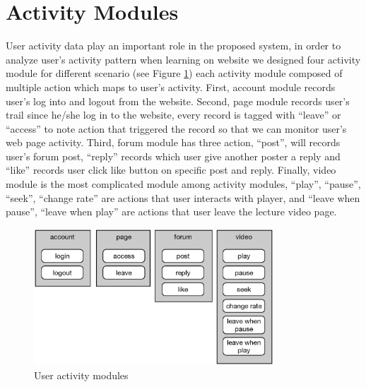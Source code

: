 \section{Activity Modules}
User activity data play an important role in the proposed system, in order to analyze user's activity pattern when learning on website we designed four activity module for different scenario (see Figure \ref{fig:act-module}) each activity module composed of multiple action which maps to user's activity.
First, account module records user's log into and logout from the website.
Second, page module records user's trail since he/she log in to the website, every record is tagged with ``leave'' or ``access'' to note action that triggered the record so that we can monitor user's web page activity.
Third, forum module has three action, ``post'', will records user's forum post, ``reply'' records which user give another poster a reply and ``like'' records user click like button on specific post and reply.
Finally, video module is the most complicated module among activity modules, ``play'', ``pause'', ``seek'', ``change rate'' are actions that user interacts with player, and ``leave when pause'', ``leave when play'' are actions that user leave the lecture video page.
\begin{figure}[H]
    \centering
    \includegraphics[width = 0.8\textwidth]{fig/activity-module.eps}
    \caption{User activity modules}
    \label{fig:act-module}
\end{figure}


